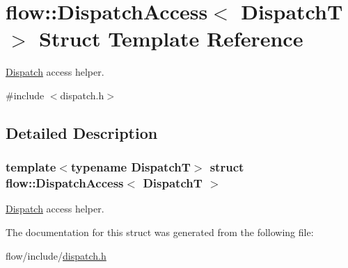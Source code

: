 \hypertarget{structflow_1_1_dispatch_access}{}\section{flow\+:\+:Dispatch\+Access$<$ DispatchT $>$ Struct Template Reference}
\label{structflow_1_1_dispatch_access}


\hyperlink{classflow_1_1_dispatch}{Dispatch} access helper.  




{\ttfamily \#include $<$dispatch.\+h$>$}



\subsection{Detailed Description}
\subsubsection*{template$<$typename DispatchT$>$\newline
struct flow\+::\+Dispatch\+Access$<$ Dispatch\+T $>$}

\hyperlink{classflow_1_1_dispatch}{Dispatch} access helper. 

The documentation for this struct was generated from the following file\+:\begin{DoxyCompactItemize}
\item 
flow/include/\hyperlink{dispatch_8h}{dispatch.\+h}\end{DoxyCompactItemize}
